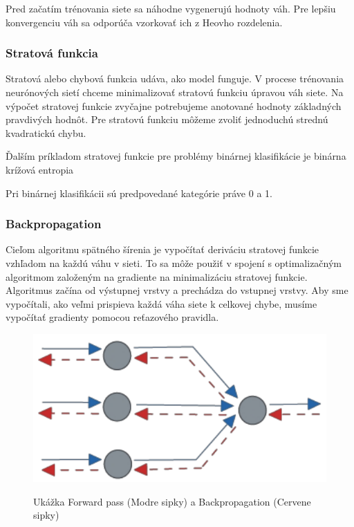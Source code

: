 Pred začatím trénovania siete sa náhodne vygenerujú hodnoty váh. Pre lepšiu
konvergenciu váh sa odporúča vzorkovať ich z Heovho rozdelenia.

\subsubsection{Stratová funkcia}\label{subsubsec:stratova_funkcia}

Stratová alebo chybová funkcia udáva, ako model funguje. V procese trénovania
neurónových sietí chceme minimalizovať stratovú funkciu úpravou váh siete. Na
výpočet stratovej funkcie zvyčajne potrebujeme anotované hodnoty základných
pravdivých hodnôt. Pre stratovú funkciu môžeme zvoliť jednoduchú strednú
kvadratickú chybu.

Ďalším príkladom stratovej funkcie pre problémy binárnej klasifikácie je binárna
krížová entropia

Pri binárnej klasifikácii sú predpovedané kategórie práve 0 a 1. 

\subsubsection{Backpropagation}\label{subsubsec:backpropagation}

Cieľom algoritmu spätného šírenia je vypočítať deriváciu stratovej funkcie vzhľadom
na každú váhu v sieti. To sa môže použiť v spojení s optimalizačným algoritmom
založeným na gradiente na minimalizáciu stratovej funkcie. Algoritmus začína
od výstupnej vrstvy a prechádza do vstupnej vrstvy. Aby sme vypočítali, ako veľmi prispieva každá váha siete k celkovej chybe, musíme vypočítať gradienty pomocou reťazového pravidla.

\begin{figure}[H]
  \includegraphics{images/forward_back.png}\label{img:forward_back}
  \caption{Ukážka Forward pass (Modre sipky) a Backpropagation (Cervene sipky)}
\end{figure}

